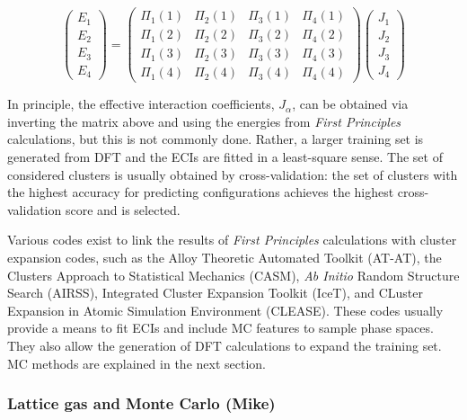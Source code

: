 \documentclass[../main.tex]{subfiles}
\begin{document}
\begin{equation}
{\left( \begin{array}{cccc}
{E_1}\\
{E_2}\\
{E_3}\\
{E_4}
\end{array}\right)}=
{\left( \begin{array}{cccc}
{\Pi_1}(1) & {\Pi_2}(1) & {\Pi_3}(1) & {\Pi_4}(1) \\
{\Pi_1}(2) & {\Pi_2}(2) & {\Pi_3}(2) & {\Pi_4}(2)  \\
{\Pi_1}(3) & {\Pi_2}(3) & {\Pi_3}(3) & {\Pi_4}(3)  \\
{\Pi_1}(4) & {\Pi_2}(4) & {\Pi_3}(4) & {\Pi_4}(4) 
\end{array}\right)}
{\left(\begin{array}{cccc}
{J_1}\\
{J_2}\\
{J_3}\\
{J_4}
\end{array}\right)}
\end{equation}

In principle, the effective interaction coefficients, $J_\alpha$, can be obtained via inverting the matrix above and using the energies from \textit{First Principles} calculations, but this is not commonly done. Rather, a larger training set is generated from DFT and the ECIs are fitted in a least-square sense. The set of considered clusters is usually obtained by cross-validation: the set of clusters with the highest accuracy for predicting configurations achieves the highest cross-validation score and is selected.

Various codes exist to link the results of \textit{First Principles} calculations with cluster expansion codes, such as the Alloy Theoretic Automated Toolkit (AT-AT),\cite{avdw:atat2,avdw:atat,VandeWalle2002} the Clusters Approach to Statistical Mechanics (CASM),\cite{natarajan2017} \textit{Ab Initio} Random Structure Search (AIRSS),\cite{Pickard_2011} Integrated Cluster Expansion Toolkit (IceT),\cite{angvist2019} and CLuster Expansion in Atomic Simulation Environment (CLEASE).\cite{chang2019} These codes usually provide a means to fit ECIs and include MC features to sample phase spaces. They also allow the generation of DFT calculations to expand the training set. MC methods are explained in the next section.

\subsubsection{Lattice gas and Monte Carlo (Mike)}
\label{sec:monte_carlo}
\end{document}
